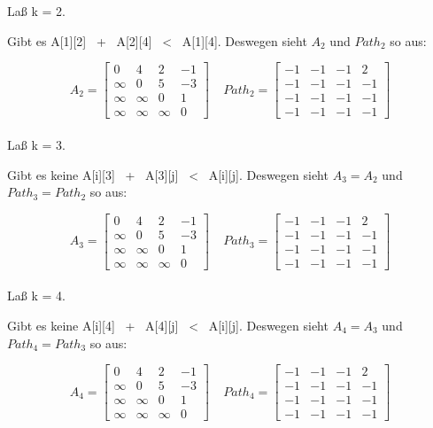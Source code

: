 \documentclass[fleqn]{article}
\begin{document}
Laß k = 2.

Gibt es A[1][2] \ + \ A[2][4] \ < \ A[1][4].
Deswegen sieht $A_{2}$ und $Path_{2}$ so aus:

$$A_{2}=\begin{bmatrix}
    0 & 4 & 2 & -1 \\
    \infty & 0 & 5 & -3 \\
    \infty & \infty & 0 & 1 \\
    \infty & \infty & \infty & 0
\end{bmatrix} \ \ \ \ \
Path_{2}=\begin{bmatrix}
    -1 & -1 & -1 & 2 \\
    -1 & -1 & -1 & -1 \\
    -1 & -1 & -1 & -1 \\
    -1 & -1 & -1 & -1
\end{bmatrix}
$$
\\  

Laß k = 3.

Gibt es keine A[i][3] \ + \ A[3][j] \ < \ A[i][j].
Deswegen sieht $A_{3} = A_{2}$ und $Path_{3} = Path_{2}$  so aus:

$$A_{3}=\begin{bmatrix}
    0 & 4 & 2 & -1 \\
    \infty & 0 & 5 & -3 \\
    \infty & \infty & 0 & 1 \\
    \infty & \infty & \infty & 0
\end{bmatrix} \ \ \ \ \
Path_{3}=\begin{bmatrix}
    -1 & -1 & -1 & 2 \\
    -1 & -1 & -1 & -1 \\
    -1 & -1 & -1 & -1 \\
    -1 & -1 & -1 & -1
\end{bmatrix}
$$
\\

Laß k = 4.

Gibt es keine A[i][4] \ + \ A[4][j] \ < \ A[i][j].
Deswegen sieht $A_{4} = A_{3}$ und $Path_{4} = Path_{3}$  so aus:

$$A_{4}=\begin{bmatrix}
    0 & 4 & 2 & -1 \\
    \infty & 0 & 5 & -3 \\
    \infty & \infty & 0 & 1 \\
    \infty & \infty & \infty & 0
\end{bmatrix} \ \ \ \ \
Path_{4}=\begin{bmatrix}
    -1 & -1 & -1 & 2 \\
    -1 & -1 & -1 & -1 \\
    -1 & -1 & -1 & -1 \\
    -1 & -1 & -1 & -1
\end{bmatrix}
$$
\end{document}
